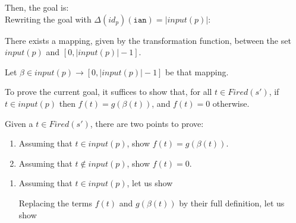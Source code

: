 \documentclass[dvipsnames,12pt]{article}
\begin{document}
\begin{niproof}
\begin{itemize}
    \noindent{}Then, the goal is: \\
    
    Rewriting the goal with $\Delta(id_p)(\texttt{ian})=\vert{}input(p)\vert$:

    There exists a mapping, given by the transformation function,
    between the set $input(p)$ and $[0,\vert{}input(p)\vert-1]$.

    Let $\beta\in{}input(p)\rightarrow[0,\vert{}input(p)\vert-1]$ be
    that mapping.

    To prove the current goal, it suffices to show that, for all
    $t\in{}Fired(s')$, if $t\in{}input(p)$ then $f(t)=g(\beta(t))$,
    and $f(t)=0$ otherwise.

    Given a $t\in{}Fired(s')$, there are two points to prove:

    \begin{enumerate}
    \item Assuming that $t\in{}input(p)$, show $f(t)=g(\beta(t))$.
    \item Assuming that $t\notin{}input(p)$, show $f(t)=0$.
    \end{enumerate}

    \begin{enumerate}
    \item Assuming that $t\in{}input(p)$, let us show

      Replacing the terms $f(t)$ and $g(\beta(t))$ by their full
      definition, let us show

      \\


\end{enumerate}
\end{itemize}
\end{niproof}
\end{document}
